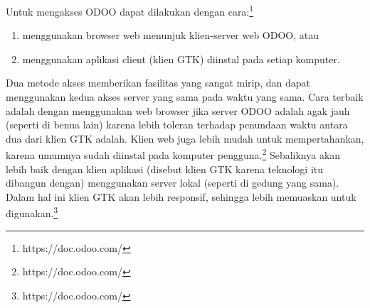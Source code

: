 Untuk mengakses ODOO dapat dilakukan dengan cara:\footnote{https://doc.odoo.com/}
\begin{enumerate}
	\item menggunakan browser web menunjuk klien-server web ODOO, atau
	\item menggunakan aplikasi client (klien GTK) diinstal pada setiap komputer.
\end{enumerate}
Dua metode akses memberikan fasilitas yang sangat mirip, dan dapat menggunakan kedua akses server yang sama pada waktu yang sama. Cara terbaik adalah dengan menggunakan web browser jika server ODOO adalah agak jauh (seperti di benua lain) karena lebih toleran terhadap penundaan waktu antara dua dari klien GTK adalah. Klien web juga lebih mudah untuk mempertahankan, karena umumnya sudah diinstal pada komputer pengguna.\footnote{https://doc.odoo.com/}
Sebaliknya akan lebih baik dengan klien aplikasi (disebut klien GTK karena teknologi itu dibangun dengan) menggunakan server lokal (seperti di gedung yang sama). Dalam hal ini klien GTK akan lebih responsif, sehingga lebih memuaskan untuk digunakan.\footnote{https://doc.odoo.com/} \\

